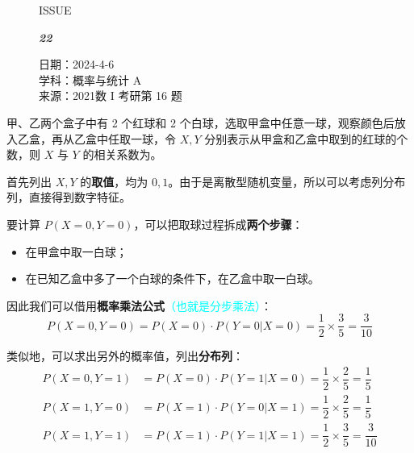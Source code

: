 \documentclass[UTF8]{ctexart}
\newcommand\Black[1]{\textcolor[gray]{0.3}{#1}}
\newcommand\Brown[1]{\textcolor[HTML]{998A4E}{#1}}
\newcommand\IssueNumber{22}
\newcommand\Date{2024-4-6}
\newcommand\Subject{概率与统计 A}
\newcommand\Source{2021数 I 考研第 16 题}
\begin{document}
\begin{figure}[H]
\hspace{1cm}
\begin{minipage}[t]{0.3\textwidth}
\centering
    \Brown{\Genshin ISSUE}

    \vspace{-0.6cm}
    \Huge \Issue\slshape\bfseries\Black{\IssueNumber}
\end{minipage}
\hfill
\begin{minipage}[t]{0.35\textwidth}
\small
\centering
    \Brown{日期：\Date} \\
\vspace{-0.1cm}
    \Brown{学科：\Subject} \\
\vspace{-0.1cm}
    \Brown{来源：\Source}
\end{minipage}
\hspace{0.8cm}
\end{figure}

{\color{cyan!50!black} 甲、乙两个盒子中有 2 个红球和 2 个白球，选取甲盒中任意一球，观察颜色后放入乙盒，再从乙盒中任取一球，令 $X,Y$ 分别表示从甲盒和乙盒中取到的红球的个数，则 $X$ 与 $Y$ 的相关系数为\underline{\hspace{2cm}}。

\vspace{1em}
}

首先列出 $X,Y$ 的\textbf{取值}，均为 $0,1$。由于是离散型随机变量，所以可以考虑列分布列，直接得到数字特征。

要计算 $P(X=0,Y=0)$，可以把取球过程拆成\textbf{两个步骤}：
\begin{itemize}%
  \item 在甲盒中取一白球；
  \item 在已知乙盒中多了一个白球的条件下，在乙盒中取一白球。
\end{itemize}
因此我们可以借用\textbf{概率乘法公式}\textcolor{cyan}{（也就是分步乘法）}：
\begin{equation}\label{eq:1}
    P(X=0,Y=0) = P(X=0)\cdot P(Y=0|X=0) = \dfrac12\times\dfrac35 = \dfrac{3}{10}
\end{equation}

类似地，可以求出另外的概率值，列出\textbf{分布列}：
\begin{equation}\label{eq:2}
\begin{split}
   P(X=0,Y=1) &= P(X=0)\cdot P(Y=1|X=0) = \dfrac12\times\dfrac25 = \dfrac15 \\
   P(X=1,Y=0) &= P(X=1)\cdot P(Y=0|X=1) = \dfrac12\times\dfrac25 = \dfrac15 \\
   P(X=1,Y=1) &= P(X=1)\cdot P(Y=1|X=1) = \dfrac12\times\dfrac35 = \dfrac{3}{10} \\
\end{split}
\end{equation}
\end{document}
